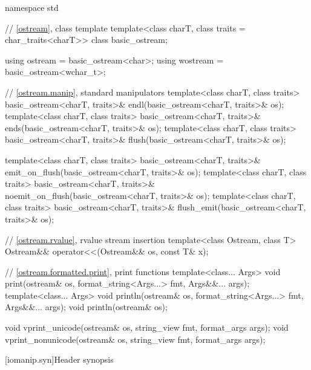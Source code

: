 %
\begin{codeblock}
namespace std {
  // \ref{ostream}, class template 
  template<class charT, class traits = char_traits<charT>>
    class basic_ostream;

  using ostream  = basic_ostream<char>;
  using wostream = basic_ostream<wchar_t>;

  // \ref{ostream.manip}, standard  manipulators
  template<class charT, class traits>
    basic_ostream<charT, traits>& endl(basic_ostream<charT, traits>& os);
  template<class charT, class traits>
    basic_ostream<charT, traits>& ends(basic_ostream<charT, traits>& os);
  template<class charT, class traits>
    basic_ostream<charT, traits>& flush(basic_ostream<charT, traits>& os);

  template<class charT, class traits>
    basic_ostream<charT, traits>& emit_on_flush(basic_ostream<charT, traits>& os);
  template<class charT, class traits>
    basic_ostream<charT, traits>& noemit_on_flush(basic_ostream<charT, traits>& os);
  template<class charT, class traits>
    basic_ostream<charT, traits>& flush_emit(basic_ostream<charT, traits>& os);

  // \ref{ostream.rvalue}, rvalue stream insertion
  template<class Ostream, class T>
    Ostream&& operator<<(Ostream&& os, const T& x);

  // \ref{ostream.formatted.print}, print functions
  template<class... Args>
    void print(ostream& os, format_string<Args...> fmt, Args&&... args);
  template<class... Args>
    void println(ostream& os, format_string<Args...> fmt, Args&&... args);
  void println(ostream& os);

  void vprint_unicode(ostream& os, string_view fmt, format_args args);
  void vprint_nonunicode(ostream& os, string_view fmt, format_args args);
}
\end{codeblock}

%
%
%
%

[iomanip.syn]{Header  synopsis}

